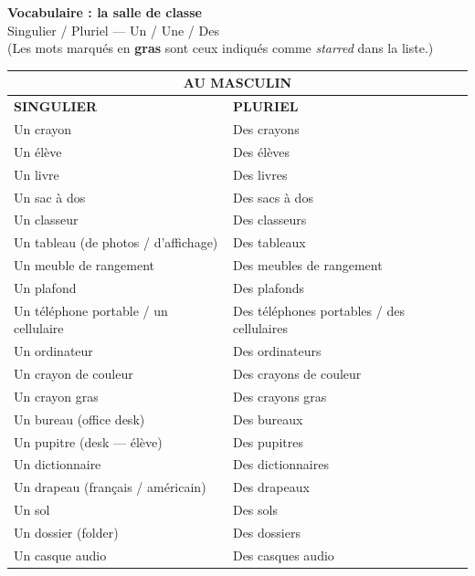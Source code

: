 \documentclass[11pt]{article}
\begin{document}

\begin{center}
  {\LARGE \textbf{Vocabulaire : la salle de classe}}\\[6pt]
  {\large Singulier / Pluriel — Un / Une / Des}\\[12pt]
  \small (Les mots marqués en \textbf{gras} sont ceux indiqués comme \emph{starred} dans la liste.)
\end{center}

\vspace{8pt}

\begin{center}
\begin{tabular}{|p{7.5cm}|p{7.5cm}|}
\hline
\multicolumn{2}{|c|}{\textbf{AU MASCULIN}}\\
\hline
\textbf{SINGULIER} & \textbf{PLURIEL} \\
\hline
Un crayon & Des crayons \\
\hline
Un élève & Des élèves \\
\hline
Un livre & Des livres \\
\hline
Un sac à dos & Des sacs à dos \\
\hline
Un classeur & Des classeurs \\
\hline
Un tableau (de photos / d'affichage) & Des tableaux \\
\hline
Un meuble de rangement & Des meubles de rangement \\
\hline
Un plafond & Des plafonds \\
\hline
Un téléphone portable / un cellulaire & Des téléphones portables / des cellulaires \\
\hline
Un ordinateur & Des ordinateurs \\
\hline
Un crayon de couleur & Des crayons de couleur \\
\hline
Un crayon gras & Des crayons gras \\
\hline
Un bureau (office desk) & Des bureaux \\
\hline
Un pupitre (desk — élève) & Des pupitres \\
\hline
Un dictionnaire & Des dictionnaires \\
\hline
Un drapeau (français / américain) & Des drapeaux \\
\hline
Un sol & Des sols \\
\hline
Un dossier (folder) & Des dossiers \\
\hline
Un casque audio & Des casques audio \\

\end{tabular}
\end{center}
\end{document}
